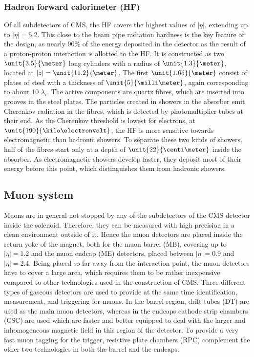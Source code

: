 \subsubsection*{Hadron forward calorimeter (HF)}
Of all subdetectors of CMS, the HF covers the highest values of $\vert\eta\vert$, extending up to $\vert\eta\vert = 5.2$. This close to the beam pipe radiation hardness is the key feature of the design, as nearly 90\% of the energy deposited in the detector as the result of a proton-proton interaction is allotted to the HF. It is constructed as two $\unit{3.5}{\meter}$ long cylinders with a radius of $\unit{1.3}{\meter}$, located at $\vert z \vert = \unit{11.2}{\meter}$. The first $\unit{1.65}{\meter}$ consist of plates of steel with a thickness of $\unit{5}{\milli\meter}$, again corresponding to about 10 $\lambda_i$. The active components are quartz fibres, which are inserted into grooves in the steel plates. The particles created in showers in the absorber emit Cherenkov radiation in the fibres, which is detected by photomultiplier tubes at their end. As the Cherenkov threshold is lowest for electrons, at $\unit{190}{\kilo\electronvolt}$, the HF is more sensitive towards electromagnetic than hadronic showers. To separate these two kinds of showers, half of the fibres start only at a depth of $\unit{22}{\centi\meter}$ inside the absorber. As electromagnetic showers develop faster, they deposit most of their energy before this point, which distinguishes them from hadronic showers. 	     
\subsection{Muon system} 
Muons are in general not stopped by any of the subdetectors of the CMS detector inside the solenoid. Therefore, they can be measured with high precision in a clean environment outside of it. Hence the muon detectors are placed inside the return yoke of the magnet, both for the muon barrel (MB), covering up to $\vert\eta\vert = 1.2$ and the muon endcap (ME) detectors, placed between $\vert\eta\vert = 0.9$ and $\vert\eta\vert = 2.4$. Being placed so far away from the interaction point, the muon detectors have to cover a large area, which requires them to be rather inexpensive compared to other technologies used in the construction of CMS. Three different types of gaseous detectors are used to provide at the same time identification, \pt measurement, and triggering for muons. In the barrel region, drift tubes (DT) are used as the main muon detectors, whereas in the endcaps cathode strip chambers (CSC) are used which are faster and better equipped to deal with the larger and inhomogeneous magnetic field in this region of the detector. To provide a very fast muon tagging for the trigger, resistive plate chambers (RPC) complement the other two technologies in both the barrel and the endcaps. 
